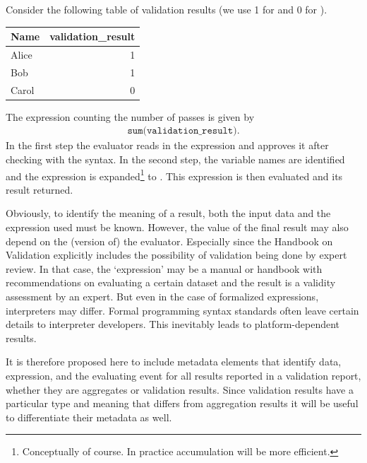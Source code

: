\begin{example} Consider the following table of validation results (we use
1 for \waar{} and 0 for \onwaar{}).
\begin{center}
\begin{tabular}{lr}
Name  & validation\_result \\
\hline
Alice & 1    \\
Bob   & 1    \\
Carol & 0    \\
\end{tabular}
\end{center}
The expression counting the number of passes is given by
\begin{align*}
\texttt{sum(validation\_result)}.
\end{align*}
In the first step the evaluator reads in the expression and approves it after
checking with the syntax. In the second step, the variable names are identified
and the expression is expanded\footnote{Conceptually of course. In practice
accumulation will be more efficient.} to .  This expression is
then evaluated and its result returned.
\end{example}
Obviously, to identify the meaning of a result, both the input data and the
expression used must be known. However, the value of the final result may also
depend on the (version of) the evaluator. Especially since the Handbook on
Validation explicitly includes the possibility of validation being done by
expert review. In that case, the `expression' may be a manual or handbook with
recommendations on evaluating a certain dataset and the result is a validity
assessment by an expert. But even in the case of formalized expressions,
interpreters may differ. Formal programming syntax standards often leave
certain details to interpreter developers. This inevitably leads to
platform-dependent results. 

It is therefore proposed here to include metadata elements that identify data,
expression, and the evaluating event for all results reported in a validation
report, whether they are aggregates or validation results. Since validation
results have a particular type and meaning that differs from aggregation
results it will be useful to differentiate their metadata as well.









